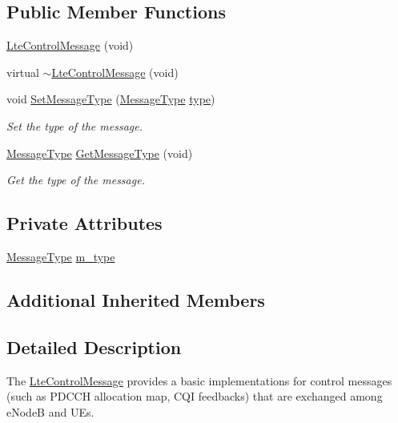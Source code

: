 \subsection*{Public Member Functions}
\begin{DoxyCompactItemize}
\item 
\hyperlink{classns3_1_1LteControlMessage_a1cf03243567bd8704fb7f865101d3f09}{Lte\+Control\+Message} (void)
\item 
virtual \hyperlink{classns3_1_1LteControlMessage_a9a36b79271b802b66a2b35c1145b682e}{$\sim$\+Lte\+Control\+Message} (void)
\item 
void \hyperlink{classns3_1_1LteControlMessage_abb414704adba7c1949576462c41b84ad}{Set\+Message\+Type} (\hyperlink{classns3_1_1LteControlMessage_a9f9798d5aa8ad40f6432285b4b06135b}{Message\+Type} \hyperlink{visualizer-ideas_8txt_add98db9e15e2a58cf2b57623e7aa893a}{type})
\begin{DoxyCompactList}\small\item\em Set the type of the message. \end{DoxyCompactList}\item 
\hyperlink{classns3_1_1LteControlMessage_a9f9798d5aa8ad40f6432285b4b06135b}{Message\+Type} \hyperlink{classns3_1_1LteControlMessage_a6f7a72fb8be9fdb9faf2d26b4380f19a}{Get\+Message\+Type} (void)
\begin{DoxyCompactList}\small\item\em Get the type of the message. \end{DoxyCompactList}\end{DoxyCompactItemize}
\subsection*{Private Attributes}
\begin{DoxyCompactItemize}
\item 
\hyperlink{classns3_1_1LteControlMessage_a9f9798d5aa8ad40f6432285b4b06135b}{Message\+Type} \hyperlink{classns3_1_1LteControlMessage_a93d63619d05b76cd19f1daf54428eaa6}{m\+\_\+type}
\end{DoxyCompactItemize}
\subsection*{Additional Inherited Members}


\subsection{Detailed Description}
The \hyperlink{classns3_1_1LteControlMessage}{Lte\+Control\+Message} provides a basic implementations for control messages (such as P\+D\+C\+CH allocation map, C\+QI feedbacks) that are exchanged among e\+NodeB and U\+Es. 

